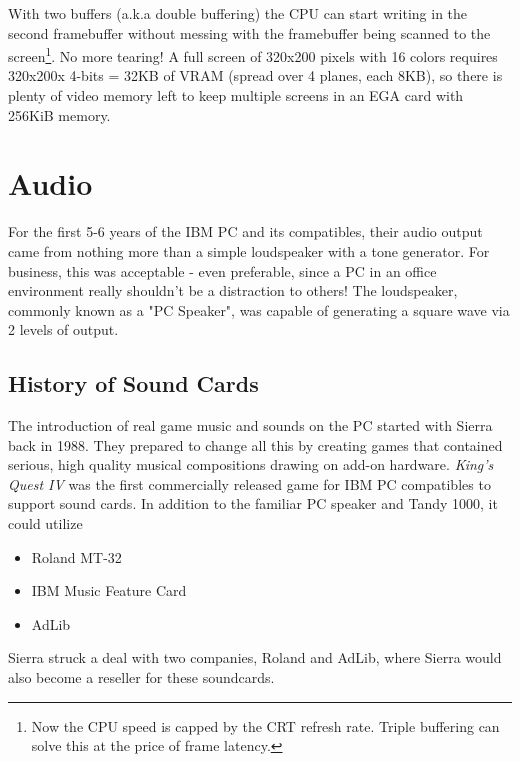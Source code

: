 \documentclass[book.tex]{subfiles}
\begin{document}
\par
With two buffers (a.k.a double buffering) the CPU can start writing in the second framebuffer without messing with the framebuffer being scanned to the screen\footnote{Now the CPU speed is capped by the CRT refresh rate. Triple buffering can solve this at the price of frame latency.}. No more tearing! A full screen of 320x200 pixels with 16 colors requires 320x200x 4-bits = 32KB of VRAM (spread over 4 planes, each 8KB), so there is plenty of video memory left to keep multiple screens in an EGA card with 256KiB memory.






\section{Audio}
\label{hardware-audio}
For the first 5-6 years of the IBM PC and its compatibles, their audio output came from nothing more than a simple loudspeaker with a tone generator. For business, this was acceptable - even preferable, since a PC in an office environment really shouldn't be a distraction to others! The loudspeaker, commonly known as a "PC Speaker", was capable of generating a square wave via 2 levels of output.\\
\begin{figure}[H]

\centering

\end{figure}


\subsection{History of Sound Cards}
The introduction of real game music and sounds on the PC started with Sierra back in 1988. They prepared to change all this by creating games that contained serious, high quality musical compositions drawing on add-on hardware. \textit{King's Quest IV} was the first commercially released game for IBM PC compatibles to support sound cards. In addition to the familiar PC speaker and Tandy 1000, it could utilize 
\begin{itemize}
    \item Roland MT-32
    \item IBM Music Feature Card
    \item AdLib
\end{itemize}
 
Sierra struck a deal with two companies, Roland and AdLib, where Sierra would also become a reseller for these soundcards. \\
\end{document}
